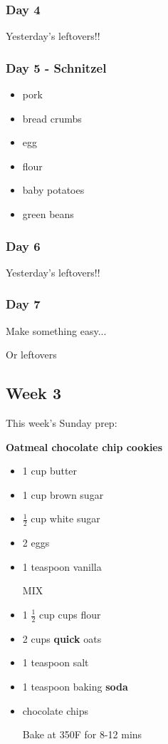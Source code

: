 \documentclass[11pt, a4paper]{article}
\begin{document}
\subsubsection{Day 4}
\vspace{1pc}
Yesterday's leftovers!!

\subsubsection{Day 5 - Schnitzel}
\vspace{1pc}
\begin{itemize}
\item pork
\item bread crumbs
\item egg
\item flour
\item baby potatoes
\item green beans
\end{itemize}

\subsubsection{Day 6}
\vspace{1pc}
Yesterday's leftovers!!

\subsubsection{Day 7}
\vspace{1pc}
\noindent Make something easy...
\par
Or leftovers


\vspace{0.917 pc} %


\pagebreak
\subsection{Week 3}

This week's Sunday prep:
\par
\vspace{1pc}
\noindent\textbf{Oatmeal chocolate chip cookies}
\par

\begin{itemize}
\item 1 cup butter
\item 1 cup brown sugar
\item $\frac{1}{2}$ cup white sugar
\item 2 eggs
\item 1 teaspoon vanilla
\par
MIX
\item 1 $\frac{1}{2}$ cup cups flour
\item 2 cups \textbf{quick} oats
\item 1 teaspoon salt
\item 1 teaspoon baking \textbf{soda}
\item chocolate chips
\par
Bake at 350F for 8-12 mins
\end{itemize}
\end{document}
